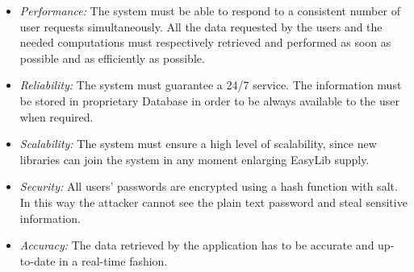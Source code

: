 \begin{itemize}
\item \emph{Performance:} The system must be able to respond to a consistent number of user requests simultaneously. All the data requested by the users and the needed computations must respectively retrieved and performed as soon as possible and as efficiently as possible.

\item \emph{Reliability:} The system must guarantee a 24/7 service. The information must be stored in proprietary Database in order to be always available to the user when required.
\item \emph{Scalability:} The system must ensure a high level of scalability, since new libraries can join the system in any moment enlarging EasyLib supply.
\item \emph{Security:} All users’ passwords are encrypted using a hash function with salt. In this way the attacker cannot see the plain text password and steal sensitive information.

\item \emph{Accuracy:} The data retrieved by the application has to be accurate and up-to-date in a real-time fashion.
\end{itemize}